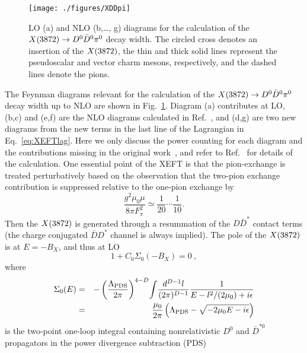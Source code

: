 \begin{figure}[tb]
  \begin{center}
   \texttt{[image: ./figures/XDDpi]}\\
   \caption{LO (a) and NLO (b,\ldots, g) diagrams for the calculation of the 
$X(3872)\to D^0\bar D^0\pi^0$ decay width. The circled cross denotes an insertion of 
the $X(3872)$, the thin and thick solid lines represent the pseudoscalar and vector 
charm mesons, respectively, and the dashed lines denote the pions.
   \label{fig:XDDpi}}
  \end{center}
\end{figure}

The Feynman diagrams relevant for the calculation of the $X(3872)\to D^0\bar
D^0\pi^0$ decay width up to NLO are shown in Fig.~\ref{fig:XDDpi}. Diagram (a)
contributes at LO, (b,c) and (e,f) are the NLO diagrams calculated in
Ref.~\cite{Fleming:2007rp}, and (d,g) are two new diagrams from the new terms in
the last line of the Lagrangian in Eq.~\eqref{eq:XEFTlag}. Here we only discuss
the power counting for each diagram and the contributions missing in the
original work~\cite{Fleming:2007rp}, and refer  to Ref.~\cite{Fleming:2007rp}
for details of the calculation. One essential point of the XEFT is that the
pion-exchange is treated perturbatively based on the observation that the
two-pion exchange contribution is suppressed relative to the one-pion exchange
by
\begin{equation}
  \frac{g^2\mu_0\mu }{8\pi F_\pi^2} \simeq \frac1{20} \cdots \frac1{10} .
\end{equation}
Then the $X(3872)$ is generated through a resummation of the $D\bar D^*$ contact 
terms (the 
charge conjugated $\bar D D^*$ channel is always implied). The 
pole of the $X(3872)$ is at $E=-B_{X}$, and thus at LO 
\begin{equation}
  1+C_0\Sigma_0(-B_{X})=0 \ ,
  \label{eq:Xpole}
\end{equation}
where 
\begin{eqnarray}
  \Sigma_0(E) &=& - \left( \frac{\Lambda_{\rm PDS}}{2\pi} \right)^{4-D}\! 
\int\! \frac{d^{D-1} l}{(2\pi)^{D-1} } \frac1{E-l^2/(2\mu_0)+i\epsilon} 
\nonumber\\
  &=& \frac{\mu_0}{2\pi} \left(\Lambda_{\rm PDS} -\sqrt{-2\mu_0 E 
-i\epsilon} \right)
\label{eq:Sigma}
\end{eqnarray}
is the two-point one-loop integral containing nonrelativistic $D^0$ and $\bar 
D^{*0}$ propagators in the power divergence subtraction (PDS) 
